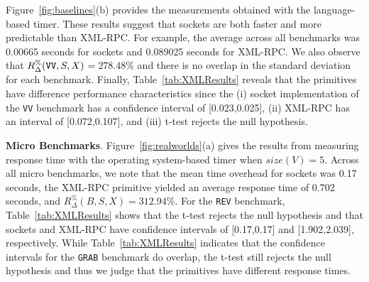 \documentclass{sig-alternate}
\begin{document}

\sloppy Figure~\ref{fig:baselines}(b) provides the measurements
obtained with the language-based timer.  These results suggest that
sockets are both faster and more predictable than XML-RPC.  For
example, the average across all benchmarks was 0.00665 seconds for
sockets and 0.089025 seconds for XML-RPC.  We also observe that
{\small $R_\Delta^\%(\mbox{{\tt VV}},S,X)$}$=278.48\%$ and there is no
overlap in the standard deviation for each benchmark.  Finally,
Table~\ref{tab:XMLResults} reveals that the primitives have difference
performance characteristics since the (i) socket implementation of the
\texttt{VV} benchmark has a confidence interval of [0.023,0.025], (ii)
XML-RPC has an interval of [0.072,0.107], and (iii) t-test rejects the
null hypothesis.








{\bf Micro Benchmarks}. Figure~\ref{fig:realworlds}(a) gives the
results from measuring response time with the operating system-based
timer when $size(V) = 5$.  Across all micro benchmarks, we note that
the mean time overhead for sockets was 0.17 seconds, the XML-RPC
primitive yielded an average response time of 0.702 seconds, and
{\small $R_\Delta^\%(B,S,X)$}$=312.94\%$.  For the \texttt{REV}
benchmark, Table~\ref{tab:XMLResults} shows that the t-test rejects
the null hypothesis and that sockets and XML-RPC have confidence
intervals of [0.17,0.17] and [1.902,2.039], respectively.  While
Table~\ref{tab:XMLResults} indicates that the confidence intervals for
the {\tt GRAB} benchmark do overlap, the t-test still rejects the null
hypothesis and thus we judge that the primitives have different
response times.
\end{document}
